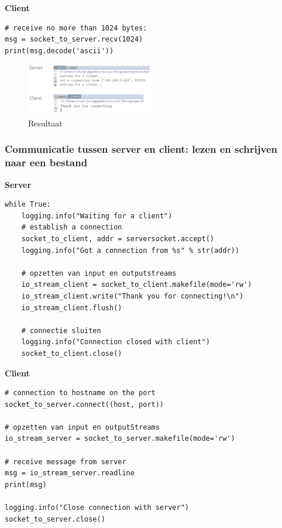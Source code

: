 \documentclass{article}
\begin{document}
\textbf{Client}

\begin{verbatim}
# receive no more than 1024 bytes:
msg = socket_to_server.recv(1024)
print(msg.decode('ascii'))
\end{verbatim}

\begin{figure}[H]
    \centering
    \includegraphics[width=0.5\textwidth]{server-client-comm-result.png}
    \caption{Resultaat}
\end{figure}

\subsubsection{Communicatie tussen server en client: lezen en schrijven naar een bestand}

\textbf{Server}

\begin{verbatim}
while True:
    logging.info("Waiting for a client")
    # establish a connection 
    socket_to_client, addr = serversocket.accept()
    logging.info("Got a connection from %s" % str(addr))
    
    # opzetten van input en outputstreams
    io_stream_client = socket_to_client.makefile(mode='rw')
    io_stream_client.write("Thank you for connecting!\n")
    io_stream_client.flush()

    # connectie sluiten
    logging.info("Connection closed with client")
    socket_to_client.close()
\end{verbatim}

\textbf{Client}

\begin{verbatim}
# connection to hostname on the port
socket_to_server.connect((host, port))

# opzetten van input en outputStreams
io_stream_server = socket_to_server.makefile(mode='rw')

# receive message from server
msg = io_stream_server.readline
print(msg)

logging.info("Close connection with server")
socket_to_server.close()
\end{verbatim}
\end{document}
